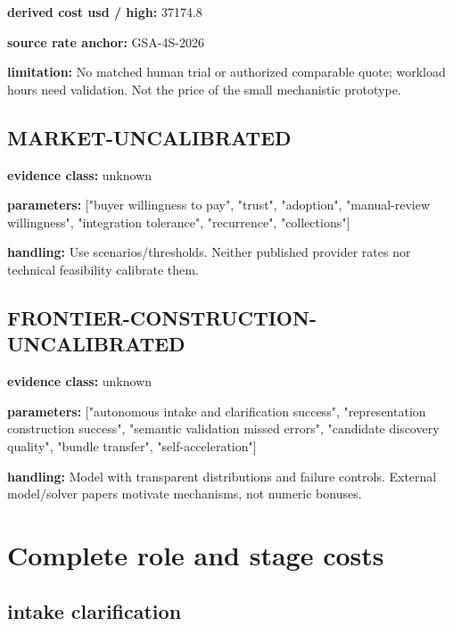 \documentclass[10pt]{article}
\begin{document}
\textbf{derived cost usd / high:} 37174.8\par

\textbf{source rate anchor:} GSA-4S-2026\par

\textbf{limitation:} No matched human trial or authorized comparable quote; workload hours need validation. Not the price of the small mechanistic prototype.\par

\subsection*{MARKET-UNCALIBRATED}

\textbf{evidence class:} unknown\par

\textbf{parameters:} ["buyer willingness to pay", "trust", "adoption", "manual-review willingness", "integration tolerance", "recurrence", "collections"]\par

\textbf{handling:} Use scenarios/thresholds. Neither published provider rates nor technical feasibility calibrate them.\par

\subsection*{FRONTIER-CONSTRUCTION-UNCALIBRATED}

\textbf{evidence class:} unknown\par

\textbf{parameters:} ["autonomous intake and clarification success", "representation construction success", "semantic validation missed errors", "candidate discovery quality", "bundle transfer", "self-acceleration"]\par

\textbf{handling:} Model with transparent distributions and failure controls. External model/solver papers motivate mechanisms, not numeric bonuses.\par

\section{Complete role and stage costs}

\subsection*{intake clarification}
\end{document}
